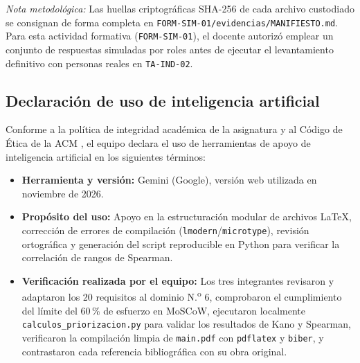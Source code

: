 \textit{Nota metodol\'ogica:} Las huellas criptogr\'aficas SHA-256 de cada archivo custodiado se consignan de forma completa en \texttt{FORM-SIM-01/evidencias/MANIFIESTO.md}. Para esta actividad formativa (\texttt{FORM-SIM-01}), el docente autoriz\'o emplear un conjunto de respuestas simuladas por roles antes de ejecutar el levantamiento definitivo con personas reales en \texttt{TA-IND-02}.

\subsection{Declaraci\'on de uso de inteligencia artificial}

Conforme a la pol\'itica de integridad acad\'emica de la asignatura y al C\'odigo de \'Etica de la ACM \cite{acm2018}, el equipo declara el uso de herramientas de apoyo de inteligencia artificial en los siguientes t\'erminos:

\begin{itemize}[leftmargin=16pt,itemsep=2pt]
    \item \textbf{Herramienta y versi\'on:} Gemini (Google), versi\'on web utilizada en noviembre de 2026.
    \item \textbf{Prop\'osito del uso:} Apoyo en la estructuraci\'on modular de archivos \LaTeX{}, correcci\'on de errores de compilaci\'on (\texttt{lmodern}/\texttt{microtype}), revisi\'on ortogr\'afica y generaci\'on del script reproducible en Python para verificar la correlaci\'on de rangos de Spearman.
    \item \textbf{Verificaci\'on realizada por el equipo:} Los tres integrantes revisaron y adaptaron los 20 requisitos al dominio N.\textsuperscript{o} 6, comprobaron el cumplimiento del l\'imite del 60\,\% de esfuerzo en MoSCoW, ejecutaron localmente \texttt{calculos\_priorizacion.py} para validar los resultados de Kano y Spearman, verificaron la compilaci\'on limpia de \texttt{main.pdf} con \texttt{pdflatex} y \texttt{biber}, y contrastaron cada referencia bibliogr\'afica con su obra original.
\end{itemize}
